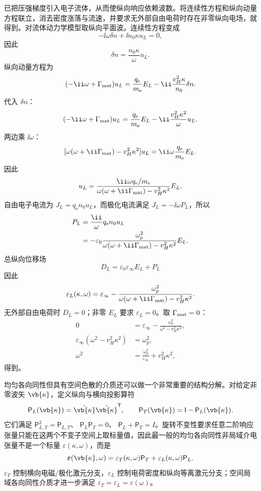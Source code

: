 \medskip

 已把压强梯度引入电子流体，从而使纵向响应依赖波数。将连续性方程和纵向动量方程联立，消去密度涨落与流速，并要求无外部自由电荷时存在非零纵向电场，就得到。对流体动力学模型取纵向平面波。连续性方程变成
\[
-\ii\omega\delta n
+\ii n_0\kappa u_L=0,
\]
因此
\[
\delta n=\frac{n_0\kappa}{\omega}u_L.
\]
纵向动量方程为
\[
(-\ii\omega+\Gamma_{\rm mat})u_L
=\frac{q_{\mathrm e}}{m_{\mathrm e}}E_L
-\ii\frac{v_H^2\kappa}{n_0}\delta n.
\]
代入 $\delta n$：
\[
(-\ii\omega+\Gamma_{\rm mat})u_L
=\frac{q_{\mathrm e}}{m_{\mathrm e}}E_L
-\ii\frac{v_H^2\kappa^2}{\omega}u_L.
\]
两边乘 $\ii\omega$：
\[
[\omega(\omega+\ii\Gamma_{\rm mat})-v_H^2\kappa^2]u_L
=\ii\omega\frac{q_{\mathrm e}}{m_{\mathrm e}}E_L.
\]
因此
\[
u_L
=\frac{\ii\omega q_{\mathrm e}/m_{\mathrm e}}
{\omega(\omega+\ii\Gamma_{\rm mat})-v_H^2\kappa^2}E_L.
\]
自由电子电流为 $J_L=q_{\mathrm e} n_0u_L$，而极化电流满足 $J_L=-\ii\omega P_L$，所以
\begin{align*}
P_L
&=\frac{\ii}{\omega}q_{\mathrm e} n_0u_L\\
&=-\varepsilon_0
\frac{\omega_p^2}
{\omega(\omega+\ii\Gamma_{\rm mat})-v_H^2\kappa^2}E_L.
\end{align*}
总纵向位移场
\[
D_L=\varepsilon_0\varepsilon_\infty E_L+P_L
\]
因此
\[
\varepsilon_L(\kappa,\omega)
=\varepsilon_\infty-
\frac{\omega_p^2}
{\omega(\omega+\ii\Gamma_{\rm mat})-v_H^2\kappa^2}.
\]
无外部自由电荷时 $D_L=0$；非零 $E_L$ 要求 $\varepsilon_L=0$。取 $\Gamma_{\rm mat}=0$：
\begin{align*}
0
&=\varepsilon_\infty-
\frac{\omega_p^2}{\omega^2-v_H^2\kappa^2},\\
\varepsilon_\infty(\omega^2-v_H^2\kappa^2)
&=\omega_p^2,\\
\omega^2
&=\frac{\omega_p^2}{\varepsilon_\infty}+v_H^2\kappa^2,
\end{align*}
得到。


均匀各向同性但具有空间色散的介质还可以做一个非常重要的结构分解。对给定非零波矢 $\vb{\kappa}$，定义纵向与横向投影算符
\begin{equation}
{
\mathsf P_L(\vb{\kappa})
=\hat{\vb{\kappa}}\hat{\vb{\kappa}}^{\mathsf T},
\qquad
\mathsf P_T(\vb{\kappa})
=\mathsf I-\mathsf P_L(\vb{\kappa}).}
\label{eq:nonlocal_LT_projectors}
\end{equation}
它们满足
$\mathsf P_{L,T}^2=\mathsf P_{L,T}$、
$\mathsf P_L\mathsf P_T=0$、
$\mathsf P_L+\mathsf P_T=I$。旋转不变性要求任意二阶响应张量只能在这两个不变子空间上取标量值，因此最一般的均匀各向同性非局域介电张量不是一个标量 $\varepsilon(\kappa,\omega)$，而是
\begin{equation}
{
\boldsymbol\varepsilon(\vb{\kappa},\omega)
=\varepsilon_T(\kappa,\omega)\mathsf P_T
+\varepsilon_L(\kappa,\omega)\mathsf P_L.}
\label{eq:isotropic_nonlocal_dielectric_LT_decomposition}
\end{equation}
$\varepsilon_T$ 控制横向电磁/极化激元分支，$\varepsilon_L$ 控制电荷密度和纵向等离激元分支；空间局域各向同性介质才进一步满足
$\varepsilon_T=\varepsilon_L=\varepsilon(\omega)$。

